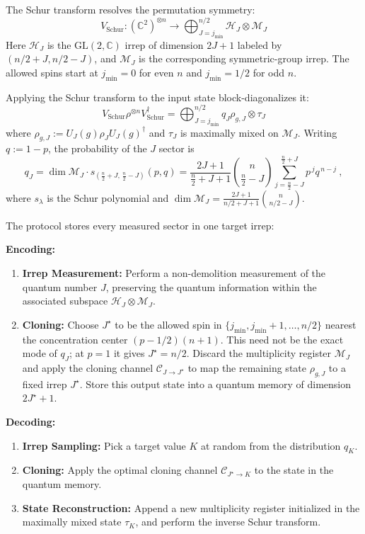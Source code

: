 \documentclass[a4paper,onecolumn,11pt]{quantumarticle}
\def\h{\mathcal{H}}
\def\C{\mathcal{C}}
\def\map{\mathcal}
\begin{document}
The Schur transform resolves the permutation symmetry:
\begin{equation}
    V_\mathrm{Schur}: (\mathbb{C}^2)^{\otimes n} \to \bigoplus_{J=j_{\min}}^{n/2} \h_J \otimes \map{M}_J
\end{equation}
Here $\h_J$ is the $\mathrm{GL}(2,\mathbb C)$ irrep of dimension
$2J+1$ labeled by $(n/2+J,n/2-J)$, and $\map M_J$ is the
corresponding symmetric-group irrep. The allowed spins start at
$j_{\min}=0$ for even $n$ and $j_{\min}=1/2$ for odd $n$.

Applying the Schur transform to the input state block-diagonalizes it:
\begin{equation}\label{eq:schur}
    V_\mathrm{Schur} \rho^{\otimes n} V_\mathrm{Schur}^\dagger = \bigoplus_{J=j_{\min}}^{n/2} q_J \rho_{g,J} \otimes \tau_J
\end{equation}
where $\rho_{g,J}:=U_J(g)\rho_JU_J(g)^\dagger$ and $\tau_J$ is
maximally mixed on $\map M_J$. Writing $q:=1-p$, the probability
of the $J$ sector is
\begin{equation}\label{eq:qJ}
    q_J = \dim\map{M}_J\cdot s_{(\frac n2+J,\,\frac n2-J)}(p,q)
    = \frac{2J+1}{\frac n2+J+1}\binom{n}{\frac n2-J}\sum_{j=\frac n2-J}^{\frac n2+J} p^{\,j}q^{\,n-j}\ ,
\end{equation}
where $s_\lambda$ is the Schur polynomial and
$\dim\map M_J=\frac{2J+1}{n/2+J+1}\binom{n}{n/2-J}$.

The protocol stores every measured sector in one target irrep:
\begin{tcolorbox}[colback=gray!5!white, colframe=gray!100!black, title=Qubit Compression Scheme (YCH~\cite{yang2016optimal})]
\textbf{Encoding:}
\begin{enumerate}
    \item \textbf{Irrep Measurement:} Perform a non-demolition measurement of the quantum number $J$, preserving the quantum information within the associated subspace $\h_J \otimes \map{M}_J$. 
    \item \textbf{Cloning:} Choose $J^\star$ to be the allowed spin in $\{j_{\min},j_{\min}+1,\ldots,n/2\}$ nearest the concentration center $(p-1/2)(n+1)$. This need not be the exact mode of $q_J$; at $p=1$ it gives $J^\star=n/2$. Discard the multiplicity register $\map{M}_J$ and apply the cloning channel $\C_{J\to J^\star}$ to map the remaining state $\rho_{g,J}$ to a fixed irrep $J^\star$. Store this output state into a quantum memory of dimension $2J^\star + 1$.
\end{enumerate}

\textbf{Decoding:}
\begin{enumerate}
    \item \textbf{Irrep Sampling:} Pick a target value $K$ at random from the distribution $q_K$.
    \item \textbf{Cloning:} Apply the optimal cloning channel $\mathcal{C}_{J^\star\to K}$ to the state in the quantum memory.
    \item \textbf{State Reconstruction:} Append a new multiplicity register initialized in the maximally mixed state $\tau_K$, and perform the inverse Schur transform.
\end{enumerate}
\end{tcolorbox}
\end{document}
